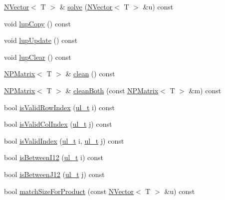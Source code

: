 \begin{DoxyCompactItemize}
\mbox{\hyperlink{class_n_vector}{N\+Vector}}$<$ T $>$ \& \mbox{\hyperlink{class_n_p_matrix_a416d816f2f0d1f01f739b10c82f42d29}{solve}} (\mbox{\hyperlink{class_n_vector}{N\+Vector}}$<$ T $>$ \&u) const
\item 
void \mbox{\hyperlink{class_n_p_matrix_a2eba5b3c2096bfb2ccac4e077880942a}{lup\+Copy}} () const
\item 
void \mbox{\hyperlink{class_n_p_matrix_ab0bb16a2c2fb70a2294eb5f64c5530df}{lup\+Update}} () const
\item 
void \mbox{\hyperlink{class_n_p_matrix_aa10cc45e0f51b547e4b9a9b89e95d007}{lup\+Clear}} () const
\item 
\mbox{\hyperlink{class_n_p_matrix}{N\+P\+Matrix}}$<$ T $>$ \& \mbox{\hyperlink{class_n_p_matrix_ad6c14f6a92b15709ddee8213067c8955}{clean}} () const
\item 
\mbox{\hyperlink{class_n_p_matrix}{N\+P\+Matrix}}$<$ T $>$ \& \mbox{\hyperlink{class_n_p_matrix_abbee6873ebebfb5080a9719e4154f638}{clean\+Both}} (const \mbox{\hyperlink{class_n_p_matrix}{N\+P\+Matrix}}$<$ T $>$ \&m) const
\item 
bool \mbox{\hyperlink{class_n_p_matrix_afc5221cb1f5d1e1919801a0ff32751fe}{is\+Valid\+Row\+Index}} (\mbox{\hyperlink{group___n_algebra_ga1b140a2034db3f5dfe18a987745df43a}{ul\+\_\+t}} i) const
\item 
bool \mbox{\hyperlink{class_n_p_matrix_ab3f19d6c9259ef6e0a919ea7ad85a5a1}{is\+Valid\+Col\+Index}} (\mbox{\hyperlink{group___n_algebra_ga1b140a2034db3f5dfe18a987745df43a}{ul\+\_\+t}} j) const
\item 
bool \mbox{\hyperlink{class_n_p_matrix_a3d584ab75f97711997f39ffefef1f78b}{is\+Valid\+Index}} (\mbox{\hyperlink{group___n_algebra_ga1b140a2034db3f5dfe18a987745df43a}{ul\+\_\+t}} i, \mbox{\hyperlink{group___n_algebra_ga1b140a2034db3f5dfe18a987745df43a}{ul\+\_\+t}} j) const
\item 
bool \mbox{\hyperlink{class_n_p_matrix_a0c1a788260180b0df60b8d049d121859}{is\+Between\+I12}} (\mbox{\hyperlink{group___n_algebra_ga1b140a2034db3f5dfe18a987745df43a}{ul\+\_\+t}} i) const
\item 
bool \mbox{\hyperlink{class_n_p_matrix_aeb0ca9af7c136d9ffa4d27226c922591}{is\+Between\+J12}} (\mbox{\hyperlink{group___n_algebra_ga1b140a2034db3f5dfe18a987745df43a}{ul\+\_\+t}} j) const
\item 
bool \mbox{\hyperlink{class_n_p_matrix_a748282f2d472970dbd20e3b2f6d62032}{match\+Size\+For\+Product}} (const \mbox{\hyperlink{class_n_vector}{N\+Vector}}$<$ T $>$ \&u) const
\item 

\end{DoxyCompactItemize}
